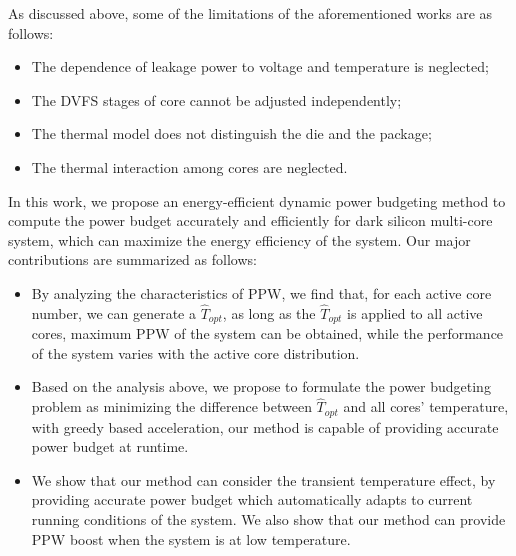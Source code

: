 As discussed above, some of the limitations of the aforementioned works are as follows:
\begin{itemize}  
\item The dependence of leakage power to voltage and temperature is neglected;
\item The DVFS stages of core cannot be adjusted independently;
\item The thermal model does not distinguish the die and the package;
\item The thermal interaction among cores are neglected.
\end{itemize} 

In this work, we propose an energy-efficient dynamic power budgeting method to compute the power budget accurately and efficiently for dark silicon multi-core system, which can maximize the energy efficiency of the system. Our major contributions are summarized as follows:
\begin{itemize}
\item By analyzing the characteristics of PPW, we find that, for each active core number, we can generate a $\hat{T}_{opt}$, as long as the $\hat{T}_{opt}$ is applied to all active cores, maximum PPW of the system can be obtained, while the performance of the system varies with the active core distribution.
\item Based on the analysis above, we propose to formulate the power budgeting problem as minimizing the difference between $\hat{T}_{opt}$ and all cores' temperature, with greedy based acceleration, our method is capable of providing accurate power budget at runtime.
\item We show that our method can consider the transient temperature effect, by providing accurate power budget which automatically adapts to current running conditions of the system. We also show that our method can provide PPW boost when the system is at low temperature.
\end{itemize} 